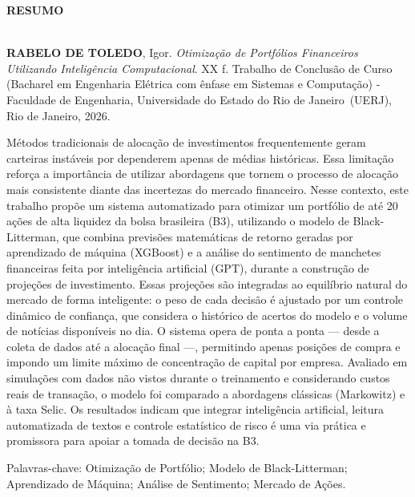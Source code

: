 \begin{center}
\textbf{RESUMO}
\end{center}

%
%

$\!$\\

\hspace{-1.3cm}\textbf{RABELO DE TOLEDO}, Igor. \textit{Otimização de Portfólios Financeiros Utilizando Inteligência Computacional}. XX f. Trabalho de Conclusão de Curso (Bacharel em Engenharia Elétrica com ênfase em Sistemas e Computação) - Faculdade de Engenharia, Universidade do Estado do Rio de Janeiro~(UERJ), Rio de Janeiro, 2026.

\vspace{.2cm}

Métodos tradicionais de alocação de investimentos frequentemente geram carteiras instáveis por dependerem apenas de médias históricas. Essa limitação reforça a importância de utilizar abordagens que tornem o processo de alocação mais consistente diante das incertezas do mercado financeiro. Nesse contexto, este trabalho propõe um sistema automatizado para otimizar um portfólio de até 20 ações de alta liquidez da bolsa brasileira (B3), utilizando o modelo de Black-Litterman,  que combina previsões matemáticas de retorno geradas por aprendizado de máquina (XGBoost) e a análise do sentimento de manchetes financeiras feita por inteligência artificial (GPT), durante a construção de projeções de investimento.
Essas projeções são integradas ao equilíbrio natural do mercado de forma inteligente: o peso de cada decisão é ajustado por um controle dinâmico de confiança, que considera o histórico de acertos do modelo e o volume de notícias disponíveis no dia. O sistema opera de ponta a ponta — desde a coleta de dados até a alocação final —, permitindo apenas posições de compra e impondo um limite máximo de concentração de capital por empresa.
Avaliado em simulações com dados não vistos durante o treinamento e considerando custos reais de transação, o modelo foi comparado a abordagens clássicas (Markowitz) e à taxa Selic. Os resultados indicam que integrar inteligência artificial, leitura automatizada de textos e controle estatístico de risco é uma via prática e promissora para apoiar a tomada de decisão na B3.

\vspace{1cm}

\hspace{-1.3cm}Palavras-chave: Otimização de Portfólio; Modelo de Black-Litterman; Aprendizado de Máquina; Análise de Sentimento; Mercado de Ações.